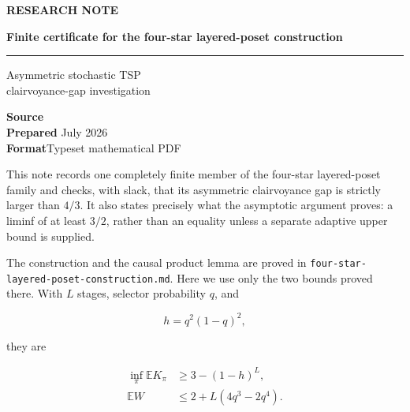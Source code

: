 \documentclass[11pt,a4paper]{article}
\newenvironment{ResearchContents}
  {\begin{tcolorbox}[breakable,colback=SoftBlue,colframe=SoftBlue,arc=2pt]}
  {\end{tcolorbox}}
\begin{document}
\color{BodyGray}
\begin{titlepage}
  \thispagestyle{empty}
  \vspace*{22mm}
  {\sffamily\small\bfseries\color{Accent}\MakeUppercase{Research note}}\par
  \vspace{8mm}
  {\sffamily\fontsize{20}{24}\selectfont\bfseries\color{Navy} Finite certificate for the four-star layered-poset construction}\par
  \vspace{6mm}
  {\color{Accent}\rule{42mm}{1.4pt}}\par
  \vspace{11mm}
  {\Large\color{BodyGray} Asymmetric stochastic TSP\\
  clairvoyance-gap investigation}\par
  \vfill
  \begin{tcolorbox}[
    colback=SoftBlue,colframe=SoftBlue,arc=2pt,
    left=10pt,right=10pt,top=8pt,bottom=8pt]
    \sffamily
    \textbf{Source}\quad {}\\[3pt]
    \textbf{Prepared} July 2026\\[3pt]
    \textbf{Format}\quad Typeset mathematical PDF
  \end{tcolorbox}
  \vspace{12mm}
\end{titlepage}

\begin{ResearchContents}
\tableofcontents
\end{ResearchContents}
\clearpage

This note records one completely finite member of the four-star layered-poset family and checks, with slack, that its asymmetric clairvoyance gap is strictly larger than \(4/3\).  It also states precisely what the asymptotic argument proves: a liminf of at least \(3/2\), rather than an equality unless a separate adaptive upper bound is supplied.


The construction and the causal product lemma are proved in \nolinkurl{four-star-layered-poset-construction.md}.  Here we use only the two bounds proved there.  With \(L\) stages, selector probability \(q\), and


\[
                    h=q^2(1-q)^2,
\]

they are


\begin{equation}
\begin{aligned}
 \inf_\pi \mathbb E K_\pi
   &\ge 3-(1-h)^L,\\
 \mathbb E W
   &\le 2+L(4q^3-2q^4).
\end{aligned}
\tag{2}
\end{equation}
\end{document}
